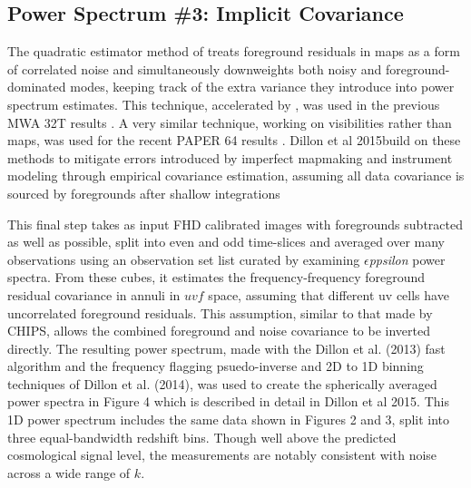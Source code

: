 \documentclass[preprint]{aastex}
\def\eppsilon{{\it $\epsilon$ppsilon }}
\def\dilloncite{Dillon et al 2015}
\begin{document}

\subsection{Power Spectrum \#3: Implicit Covariance}
\label{sec:empirical _cov}

The quadratic estimator method of \cite{Liu:2011p8763} treats foreground residuals in maps as a form of correlated noise and simultaneously downweights both noisy and foreground-dominated modes, keeping track of the extra variance they introduce into power spectrum estimates. This technique, accelerated by \cite{Dillon:2013p10497}, was used in the previous MWA 32T results \cite{Dillon:2014p9788}.  A very similar technique, working on visibilities rather than maps, was used for the recent PAPER 64 results  \cite{2015arXiv150206016A}.  \dilloncite build on these methods to mitigate errors introduced by imperfect mapmaking and instrument modeling through empirical covariance estimation, assuming all data covariance is sourced by foregrounds after shallow integrations

This final step takes as input FHD calibrated images with foregrounds subtracted as well as possible, split into even and odd time-slices and averaged over many observations using an observation set list curated by examining \eppsilon power spectra. From these cubes, it estimates the frequency-frequency foreground residual covariance in annuli in $uvf$ space, assuming that different uv cells have uncorrelated foreground residuals. This assumption, similar to that made by CHIPS, allows the combined foreground and noise covariance to be inverted directly. The resulting power spectrum, made with the Dillon et al. (2013) fast algorithm and the frequency flagging psuedo-inverse and 2D to 1D binning techniques of Dillon et al. (2014), was used to create the spherically averaged power spectra in Figure 4 which is described in detail in \dilloncite. This 1D power spectrum includes the same data shown in Figures 2 and 3, split into three equal-bandwidth redshift bins. Though well above the predicted cosmological signal level, the measurements are notably consistent with noise across a wide range of $k$. 
\end{document}
